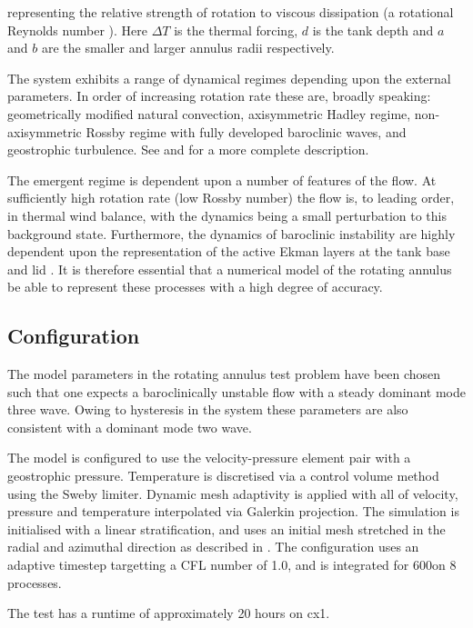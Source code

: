 representing the relative strength of rotation to viscous dissipation (a rotational
Reynolds number \citep{lorenz1967}). Here $\Delta T$ is the thermal forcing, $d$ is the tank depth and $a$ and $b$
are the smaller and larger annulus radii respectively.

The system exhibits a range of dynamical regimes depending upon the external parameters.
In order of increasing rotation
rate these are, broadly speaking: geometrically modified natural convection,
axisymmetric Hadley regime, non-axisymmetric Rossby regime with fully developed
baroclinic waves, and geostrophic turbulence. See \citet{hide1975} and \citet{frueh1997}
for a more complete description.

The emergent regime is dependent upon a number of features of the flow. At
sufficiently high rotation rate (low Rossby number) the flow is, to leading
order, in thermal wind balance, with the dynamics being a small perturbation to
this background state. Furthermore, the dynamics of baroclinic instability are
highly dependent upon the representation of the active Ekman layers at the tank
base and lid \citep{hide1969}. It is therefore essential that a numerical model
of the rotating annulus be able to represent these processes with a high degree
of accuracy.

\subsection{Configuration}

The model parameters in the rotating annulus test problem have been chosen such
that one expects a baroclinically unstable flow with a steady dominant mode three
wave. Owing to hysteresis in the system these parameters are also consistent with
a dominant mode two wave.

The model is configured to use the \Poo velocity-pressure element pair with a \Ptwo
geostrophic pressure. Temperature is discretised via a control volume method using
the Sweby limiter. Dynamic mesh adaptivity is applied with all of velocity, pressure
and temperature interpolated via Galerkin projection. The simulation is initialised
with a linear stratification, and uses an initial mesh stretched in
the radial and azimuthal direction as described in \citet{farnell1975}. The
configuration uses an adaptive timestep targetting a CFL number of 1.0, and is
integrated for 600\s[] on 8 processes.

The test has a runtime of approximately 20 hours on cx1.

